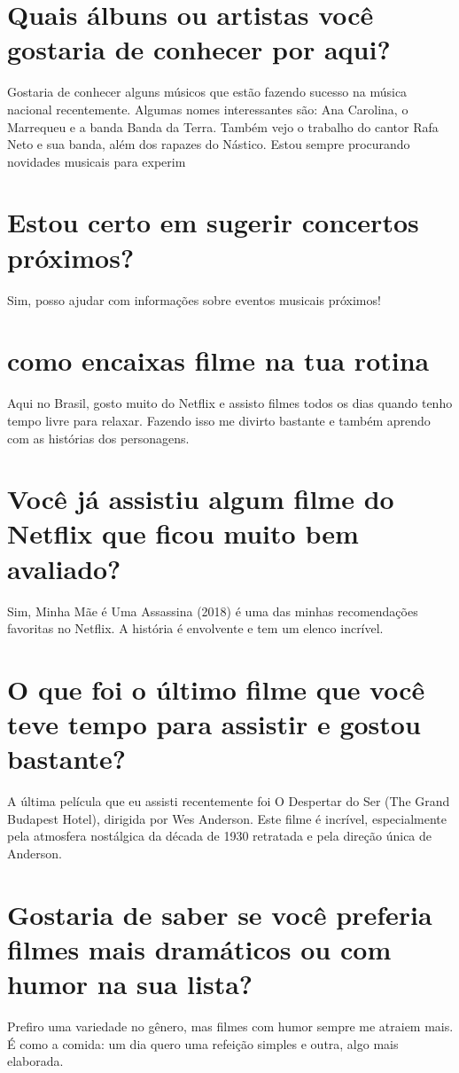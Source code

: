 \documentclass[11pt,a4paper]{article}
\begin{document}
\section{Quais álbuns ou artistas você gostaria de conhecer por aqui?}
Gostaria de conhecer alguns músicos que estão fazendo sucesso na música nacional recentemente. Algumas nomes interessantes são: Ana Carolina, o Marrequeu e a banda Banda da Terra. Também vejo o trabalho do cantor Rafa Neto e sua banda, além dos rapazes do Nástico. Estou sempre procurando novidades musicais para experim

\section{Estou certo em sugerir concertos próximos?}
Sim, posso ajudar com informações sobre eventos musicais próximos!

\section{como encaixas filme na tua rotina}
Aqui no Brasil, gosto muito do Netflix e assisto filmes todos os dias quando tenho tempo livre para relaxar. Fazendo isso me divirto bastante e também aprendo com as histórias dos personagens.

\section{Você já assistiu algum filme do Netflix que ficou muito bem avaliado?}
Sim, Minha Mãe é Uma Assassina (2018) é uma das minhas recomendações favoritas no Netflix. A história é envolvente e tem um elenco incrível.

\section{O que foi o último filme que você teve tempo para assistir e gostou bastante?}
A última película que eu assisti recentemente foi O Despertar do Ser (The Grand Budapest Hotel), dirigida por Wes Anderson. Este filme é incrível, especialmente pela atmosfera nostálgica da década de 1930 retratada e pela direção única de Anderson.

\section{Gostaria de saber se você preferia filmes mais dramáticos ou com humor na sua lista?}
Prefiro uma variedade no gênero, mas filmes com humor sempre me atraiem mais. É como a comida: um dia quero uma refeição simples e outra, algo mais elaborada.
\end{document}

